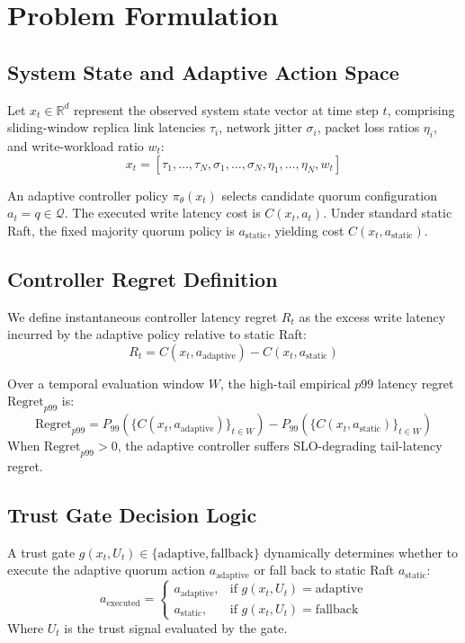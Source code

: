 \section{Problem Formulation}
\label{sec:problem}

\subsection{System State and Adaptive Action Space}
Let $x_t \in \mathbb{R}^d$ represent the observed system state vector at time step $t$, comprising sliding-window replica link latencies $\tau_i$, network jitter $\sigma_i$, packet loss ratios $\eta_i$, and write-workload ratio $w_t$:
\begin{equation}
x_t = [\tau_1, \dots, \tau_N, \sigma_1, \dots, \sigma_N, \eta_1, \dots, \eta_N, w_t]
\end{equation}

An adaptive controller policy $\pi_\theta(x_t)$ selects candidate quorum configuration $a_t = q \in \mathcal{Q}$. The executed write latency cost is $C(x_t, a_t)$. Under standard static Raft, the fixed majority quorum policy is $a_{\text{static}}$, yielding cost $C(x_t, a_{\text{static}})$.

\subsection{Controller Regret Definition}
We define instantaneous controller latency regret $R_t$ as the excess write latency incurred by the adaptive policy relative to static Raft:
\begin{equation}
R_t = C(x_t, a_{\text{adaptive}}) - C(x_t, a_{\text{static}})
\end{equation}

Over a temporal evaluation window $W$, the high-tail empirical $p99$ latency regret $\text{Regret}_{p99}$ is:
\begin{equation}
\text{Regret}_{p99} = P_{99}\left(\{C(x_t, a_{\text{adaptive}})\}_{t \in W}\right) - P_{99}\left(\{C(x_t, a_{\text{static}})\}_{t \in W}\right)
\end{equation}
When $\text{Regret}_{p99} > 0$, the adaptive controller suffers SLO-degrading tail-latency regret.

\subsection{Trust Gate Decision Logic}
A trust gate $g(x_t, U_t) \in \{\text{adaptive}, \text{fallback}\}$ dynamically determines whether to execute the adaptive quorum action $a_{\text{adaptive}}$ or fall back to static Raft $a_{\text{static}}$:
\begin{equation}
a_{\text{executed}} = 
\begin{cases} 
a_{\text{adaptive}}, & \text{if } g(x_t, U_t) = \text{adaptive} \\
a_{\text{static}}, & \text{if } g(x_t, U_t) = \text{fallback}
\end{cases}
\end{equation}
Where $U_t$ is the trust signal evaluated by the gate.
